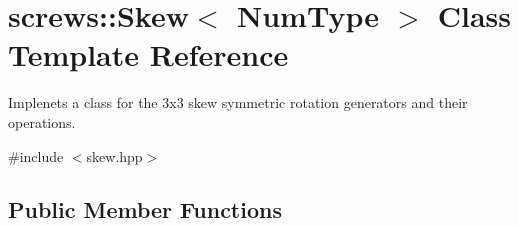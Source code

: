 \hypertarget{singletonscrews_1_1_skew}{\section{screws\+:\+:Skew$<$ Num\+Type $>$ Class Template Reference}
\label{singletonscrews_1_1_skew}
}


Implenets a class for the 3x3 skew symmetric rotation generators and their operations.  




{\ttfamily \#include $<$skew.\+hpp$>$}

\subsection*{Public Member Functions}
